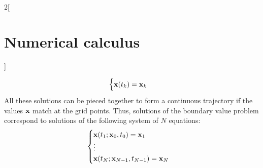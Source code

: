 \documentclass[../../../main_math.tex]{subfiles}
\begin{document}
\begin{multicols}{2}[\section{Numerical calculus}]
\begin{definition}
\begin{equation*}
\begin{cases}
        \boldsymbol{\mathrm{x}}(t_k)=\boldsymbol{\mathrm{x}}_k
      \end{cases}
    \end{equation*}
    All these solutions can be pieced together to form a continuous trajectory if the values $\boldsymbol{\mathrm{x}}$ match at the grid points. Thus, solutions of the boundary value problem correspond to solutions of the following system of $N$ equations:
    $$
      \begin{cases}
        \boldsymbol{\mathrm{x}}(t_1;\boldsymbol{\mathrm{x}}_0,t_0)=\boldsymbol{\mathrm{x}}_1 \\
        \vdots                            \\
        \boldsymbol{\mathrm{x}}(t_N;\boldsymbol{\mathrm{x}}_{N-1},t_{N-1})=\boldsymbol{\mathrm{x}}_N
      \end{cases}
    $$
  \end{definition}
\end{multicols}
\end{document}
